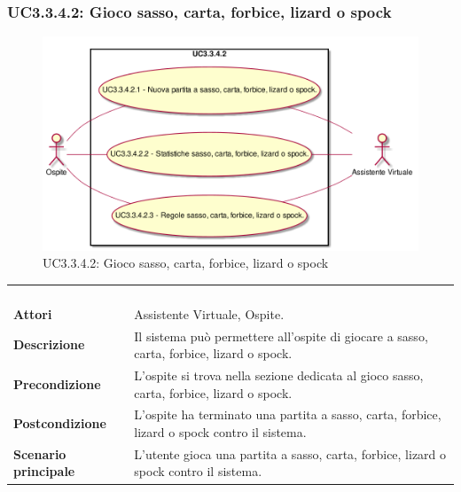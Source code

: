 \newpage\subsubsection{UC3.3.4.2: Gioco sasso, carta, forbice, lizard o spock}
\label{UC3.3.4.2}
\begin{figure}[h]
\centering
\includegraphics[width=\textwidth,height=\textheight,keepaspectratio]{images/UseCaseUC3342.png}
\caption{UC3.3.4.2: Gioco sasso, carta, forbice, lizard o spock}
\end{figure}
\begin{longtable}{l|p{10cm}}
\rowcolor[gray]{0.8} \multicolumn{2}{c}{} \\
\rowcolor[gray]{0.8} \multicolumn{2}{c}{\textbf{UC3.3.4.2 - Gioco sasso, carta, forbice, lizard o spock}} \\
\rowcolor[gray]{0.8} \multicolumn{2}{c}{} \\
\hline
&\\
\textbf{Attori} & Assistente Virtuale, Ospite.\\[7pt]
\textbf{Descrizione} & Il sistema può permettere all'ospite di giocare a  sasso, carta, forbice, lizard o spock.\\[7pt]
\textbf{Precondizione} & L'ospite si trova nella sezione dedicata al gioco sasso, carta, forbice, lizard o spock.\\[7pt]
\textbf{Postcondizione} & L'ospite ha terminato una partita a sasso, carta, forbice, lizard o spock contro il sistema.\\[7pt]
\textbf{Scenario principale} &L'utente gioca una partita a sasso, carta, forbice, lizard o spock contro il sistema.\\[7pt]\hline
\end{longtable}

